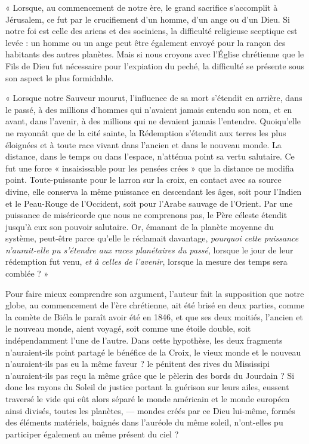 \documentclass[a4paper, 11pt, oneside]{article}
\begin{document}
« Lorsque, au commencement de notre ère, le grand sacrifice s'accomplit à Jérusalem, ce fut par le crucifiement d'un homme, d'un ange ou d'un Dieu. Si notre foi est celle des ariens et des sociniens, la difficulté religieuse sceptique est levée : un homme ou un ange peut être également envoyé pour la rançon des habitants des autres planètes. Mais si nous croyons avec l'Église chrétienne que le Fils de Dieu fut nécessaire pour l'expiation du peché, la difficulté se présente sous son aspect le plus formidable.

« Lorsque notre Sauveur mourut, l'influence de sa mort s'étendit en arrière, dans le passé, à des millions d'hommes qui n'avaient jamais entendu son nom, et en avant, dans l'avenir, à des millions qui ne devaient jamais l'entendre. Quoiqu'elle ne rayonnât que de la cité sainte, la Rédemption s'étendit aux terres les plus éloignées et à toute race vivant dans l'ancien et dans le nouveau monde. La distance, dans le temps ou dans l'espace, n'atténua point sa vertu salutaire. Ce fut une force « insaisissable pour les pensées crées » que la distance ne modifia point. Toute-puissante pour le larron sur la croix, en contact avec sa source divine, elle conserva la même puissance en descendant les âges, soit pour l'Indien et le Peau-Rouge de l'Occident, soit pour l'Arabe sauvage de l'Orient. Par une puissance de miséricorde que nous ne comprenons pas, le Père céleste étendit jusqu'à eux son pouvoir salutaire. Or, émanant de la planète moyenne du système, peut-être parce qu'elle le réclamait davantage, \emph{pourquoi cette puissance n'aurait-elle pu s'étendre aux races planétaires du passé}, lorsque le jour de leur rédemption fut venu, \emph{et à celles de l'avenir}, lorsque la mesure des temps sera comblée ? »

Pour faire mieux comprendre son argument, l'auteur fait la supposition que notre globe, au commencement de l'ère chrétienne, ait été brisé en deux parties, comme la comète de Biéla le paraît avoir été en 1846, et que ses deux moitiés, l'ancien et le nouveau monde, aient voyagé, soit comme une étoile double, soit indépendamment l'une de l'autre. Dans cette hypothèse, les deux fragments n'auraient-ils point partagé le bénéfice de la Croix, le vieux monde et le nouveau n'auraient-ils pas eu la même faveur ? le pénitent des rives du Mississipi n'auraient-ils pas reçu la même grâce que le pèlerin des bords du Jourdain ? Si donc les rayons du Soleil de justice portant la guérison sur leurs ailes, eussent traversé le vide qui eût alors séparé le monde américain et le monde européen ainsi divisés, toutes les planètes, --- mondes créés par ce Dieu lui-même, formés des éléments matériels, baignés dans l'auréole du même soleil, n'ont-elles pu participer également au même présent du ciel ?
\end{document}
